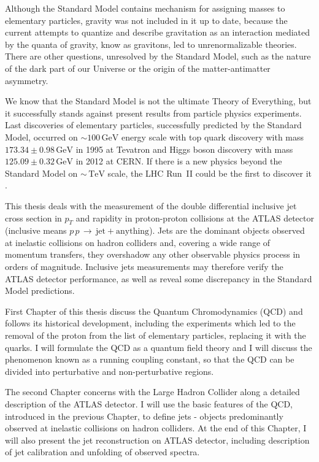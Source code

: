 \documentclass[a4paper,11pt,twoside,openright]{book}
\newcommand{\TeV}{\,\text{TeV}}
\newcommand{\GeV}{\,\text{GeV}}
\newcommand{\pt}{p_{T}}
\begin{document}
Although the Standard Model contains mechanism for assigning masses to
elementary particles, gravity was not included in it up
to date, because the current attempts to quantize and describe gravitation as an
interaction mediated by the quanta of gravity, know as gravitons, led to
unrenormalizable theories. There are other questions, unresolved by the Standard
Model, such as the nature of the dark part of our Universe or the origin of the
matter-antimatter asymmetry.

We know that the Standard Model is not the ultimate Theory of Everything,
but it successfully stands against present results from particle physics
experiments. 
Last discoveries of elementary particles, successfully predicted by the Standard
Model, occurred on $\sim 100\GeV$ energy scale with top quark discovery
\cite{TopQuark1,TopQuark2} with mass $173.34 \pm 0.98 \GeV$ in 1995 at Tevatron
and Higgs boson discovery \cite{HiggsDiscovery} with mass $125.09 \pm 0.32 \GeV$
in 2012 at CERN.
If there is a new physics beyond the Standard Model on $\sim \TeV$ scale, the
LHC Run~II could be the first to discover it \cite{PhysicsAtRun2LHC}. 

This thesis deals with the measurement of the double differential inclusive jet 
cross section in $\pt$ and rapidity in proton-proton collisions at the ATLAS
detector (inclusive means
$p\,p\,\rightarrow\,\text{jet}+\text{anything}$). 
Jets are the dominant objects observed at inelastic collisions on hadron
colliders and, covering a wide range of momentum transfers, they overshadow any
other observable physics process in orders of magnitude.
Inclusive jets measurements may therefore verify the ATLAS detector performance,
as well as reveal some discrepancy in the Standard Model predictions.

First Chapter of this thesis discuss the Quantum Chromodynamics (QCD) and
follows its historical development, including the experiments which led to the
removal of the proton from the list of elementary particles, replacing it with
the quarks. 
I will formulate the QCD as a quantum field theory and I will discuss the phenomenon
known as a running coupling constant, so that the QCD can be divided into
perturbative and non-perturbative regions.

The second Chapter concerns with the Large Hadron Collider along a detailed
description of the ATLAS detector. 
I will use the basic features of the QCD, introduced in the previous Chapter, to
define jets - objects predominantly observed at inelastic collisions on hadron
colliders. At the end of this Chapter, I will also present the jet
reconstruction on ATLAS detector, including description of jet calibration and
unfolding of observed spectra.
\end{document}
